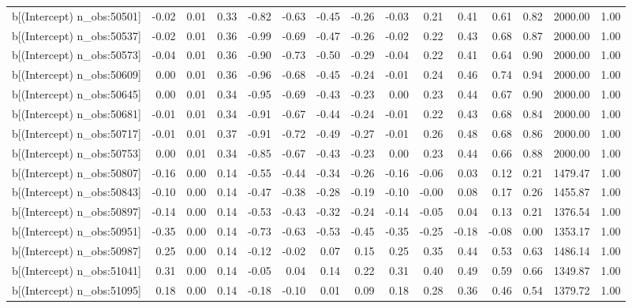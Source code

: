 \begin{table}[ht]
\begin{tabular}{rrrrrrrrrrrrrrr}
  b[(Intercept) n\_obs:50501] & -0.02 & 0.01 & 0.33 & -0.82 & -0.63 & -0.45 & -0.26 & -0.03 & 0.21 & 0.41 & 0.61 & 0.82 & 2000.00 & 1.00 \\ 
  b[(Intercept) n\_obs:50537] & -0.02 & 0.01 & 0.36 & -0.99 & -0.69 & -0.47 & -0.26 & -0.02 & 0.22 & 0.43 & 0.68 & 0.87 & 2000.00 & 1.00 \\ 
  b[(Intercept) n\_obs:50573] & -0.04 & 0.01 & 0.36 & -0.90 & -0.73 & -0.50 & -0.29 & -0.04 & 0.22 & 0.41 & 0.64 & 0.90 & 2000.00 & 1.00 \\ 
  b[(Intercept) n\_obs:50609] & 0.00 & 0.01 & 0.36 & -0.96 & -0.68 & -0.45 & -0.24 & -0.01 & 0.24 & 0.46 & 0.74 & 0.94 & 2000.00 & 1.00 \\ 
  b[(Intercept) n\_obs:50645] & 0.00 & 0.01 & 0.34 & -0.95 & -0.69 & -0.43 & -0.23 & 0.00 & 0.23 & 0.44 & 0.67 & 0.90 & 2000.00 & 1.00 \\ 
  b[(Intercept) n\_obs:50681] & -0.01 & 0.01 & 0.34 & -0.91 & -0.67 & -0.44 & -0.24 & -0.01 & 0.22 & 0.43 & 0.68 & 0.84 & 2000.00 & 1.00 \\ 
  b[(Intercept) n\_obs:50717] & -0.01 & 0.01 & 0.37 & -0.91 & -0.72 & -0.49 & -0.27 & -0.01 & 0.26 & 0.48 & 0.68 & 0.86 & 2000.00 & 1.00 \\ 
  b[(Intercept) n\_obs:50753] & 0.00 & 0.01 & 0.34 & -0.85 & -0.67 & -0.43 & -0.23 & 0.00 & 0.23 & 0.44 & 0.66 & 0.88 & 2000.00 & 1.00 \\ 
  b[(Intercept) n\_obs:50807] & -0.16 & 0.00 & 0.14 & -0.55 & -0.44 & -0.34 & -0.26 & -0.16 & -0.06 & 0.03 & 0.12 & 0.21 & 1479.47 & 1.00 \\ 
  b[(Intercept) n\_obs:50843] & -0.10 & 0.00 & 0.14 & -0.47 & -0.38 & -0.28 & -0.19 & -0.10 & -0.00 & 0.08 & 0.17 & 0.26 & 1455.87 & 1.00 \\ 
  b[(Intercept) n\_obs:50897] & -0.14 & 0.00 & 0.14 & -0.53 & -0.43 & -0.32 & -0.24 & -0.14 & -0.05 & 0.04 & 0.13 & 0.21 & 1376.54 & 1.00 \\ 
  b[(Intercept) n\_obs:50951] & -0.35 & 0.00 & 0.14 & -0.73 & -0.63 & -0.53 & -0.45 & -0.35 & -0.25 & -0.18 & -0.08 & 0.00 & 1353.17 & 1.00 \\ 
  b[(Intercept) n\_obs:50987] & 0.25 & 0.00 & 0.14 & -0.12 & -0.02 & 0.07 & 0.15 & 0.25 & 0.35 & 0.44 & 0.53 & 0.63 & 1486.14 & 1.00 \\ 
  b[(Intercept) n\_obs:51041] & 0.31 & 0.00 & 0.14 & -0.05 & 0.04 & 0.14 & 0.22 & 0.31 & 0.40 & 0.49 & 0.59 & 0.66 & 1349.87 & 1.00 \\ 
  b[(Intercept) n\_obs:51095] & 0.18 & 0.00 & 0.14 & -0.18 & -0.10 & 0.01 & 0.09 & 0.18 & 0.28 & 0.36 & 0.46 & 0.54 & 1379.72 & 1.00 \\ 

\end{tabular}
\end{table}
